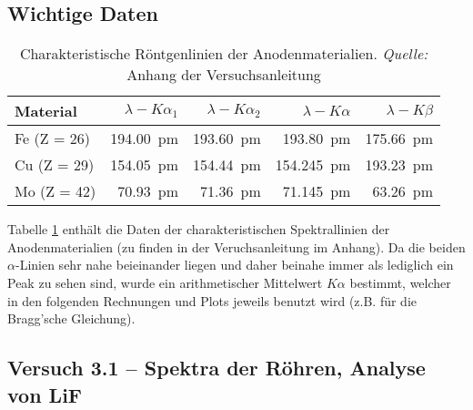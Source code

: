 \subsection{Wichtige Daten}
\label{subsec:daten}

\begin{table}[h!]
    \centering
    \small
    \caption{Charakteristische R\"ontgenlinien der Anodenmaterialien. \emph{Quelle:} Anhang der Versuchsanleitung}
    \label{tab:anodeSpetralLines}
    \begin{tabular}{lrrrr}
        \toprule

        Material            &
        $\lambda-K\alpha_1$ &
        $\lambda-K\alpha_2$ &
        $\lambda-K\alpha$   &
        $\lambda-K\beta$    \\

        \midrule

        Fe (Z = 26)              &
        \SI{194.00}{\pico\meter} &
        \SI{193.60}{\pico\meter} &
        \SI{193.80}{\pico\meter} &
        \SI{175.66}{\pico\meter} \\

        Cu (Z = 29)               &
        \SI{154.05}{\pico\meter}  &
        \SI{154.44}{\pico\meter}  &
        \SI{154.245}{\pico\meter} &
        \SI{193.23}{\pico\meter}  \\

        Mo (Z = 42)              &
        \SI{70.93}{\pico\meter}  &
        \SI{71.36}{\pico\meter}  &
        \SI{71.145}{\pico\meter} &
        \SI{63.26}{\pico\meter}  \\

        \bottomrule
    \end{tabular}
\end{table}

Tabelle \ref{tab:anodeSpetralLines} enth\"alt die Daten der charakteristischen
Spektrallinien  der Anodenmaterialien  (zu finden  in der  Veruchsanleitung im
Anhang).  Da die beiden $\alpha$-Linien sehr nahe beieinander liegen und daher
beinahe immer als  lediglich ein Peak zu sehen sind,  wurde ein arithmetischer
Mittelwert $K\alpha$ bestimmt,  welcher in den folgenden  Rechnungen und Plots
jeweils benutzt wird (z.B. f\"ur die Bragg'sche Gleichung).

\subsection{Versuch 3.1 -- Spektra der R\"ohren, Analyse von LiF}
\label{subsec:spektra}

